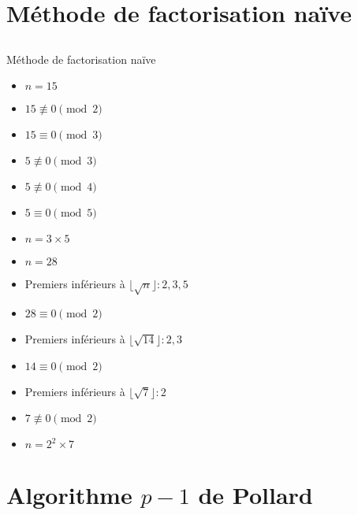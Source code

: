 \documentclass[utf8,10pt,french]{beamer}
\begin{document}
\section{Méthode de factorisation naïve}
\subsection{}
\begin{frame}{Méthode de factorisation naïve}
\begin{example}
\begin{itemize}    
\item $n = 15$ 
\item $15 \not\equiv 0 \pmod 2$
\item $15 \equiv 0 \pmod 3$
\item $5 \not\equiv 0 \pmod 3$
\item $5 \not\equiv 0 \pmod 4$ 
\item $5 \equiv 0 \pmod 5$
\item $n = 3 \times 5$
\end{itemize}
\end{example}
\end{frame}

\begin{frame}
\begin{example}
\begin{itemize}
\item $n = 28$    
\item Premiers inférieurs à $\lfloor\sqrt{n}\rfloor : 2, 3, 5$
\item $28 \equiv 0 \pmod 2$
\item Premiers inférieurs à $\lfloor\sqrt{14}\rfloor : 2, 3$
\item $14 \equiv 0 \pmod 2$
\item Premiers inférieurs à $\lfloor\sqrt{7}\rfloor : 2$
\item $7 \not\equiv 0 \pmod 2$
\item $n = 2^2 \times 7$
\end{itemize}
\end{example}
\end{frame}

\section{Algorithme $p - 1$ de Pollard}
\end{document}
